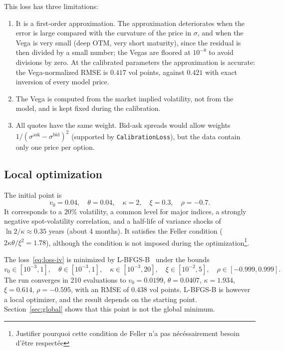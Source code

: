 \documentclass[11pt,a4paper]{article}
\theoremstyle{plain}
\theoremstyle{definition}
\begin{document}
This loss has three limitations:
\begin{enumerate}
    \item It is a first-order approximation. The approximation deteriorates when the error is large compared with the curvature of the price in $\sigma$, and when the Vega is very small (deep OTM, very short maturity), since the residual is then divided by a small number; the Vegas are floored at $10^{-8}$ to avoid divisions by zero. At the calibrated parameters the approximation is accurate: the Vega-normalized RMSE is $0.417$ vol points, against $0.421$ with exact inversion of every model price.
    \item The Vega is computed from the market implied volatility, not from the model, and is kept fixed during the calibration.
    \item All quotes have the same weight. Bid-ask spreads would allow weights $1/(\sigma^{\mathrm{ask}}-\sigma^{\mathrm{bid}})^2$ (supported by \texttt{CalibrationLoss}), but the data contain only one price per option.
\end{enumerate}

\subsection{Local optimization}
The initial point is
\begin{equation*}
    v_0 = 0.04,\quad \theta = 0.04,\quad \kappa = 2,\quad \xi = 0.3,\quad \rho = -0.7 .
\end{equation*}
It corresponds to a $20\%$ volatility, a common level for major indices, a strongly negative spot-volatility correlation, and a half-life of variance shocks of $\ln 2/\kappa\approx0.35$ years (about 4 months). It satisfies the Feller condition ($2\kappa\theta/\xi^2=1.78$), although the condition is not imposed during the optimization\footnote{Justifier pourquoi cette condition de Feller n'a pas nécéssairement besoin d'être respectée}.

The loss~\eqref{eq:loss-iv} is minimized by L-BFGS-B~\cite{byrd} under the bounds
\begin{equation}
    v_0\in[10^{-3},1],\quad
    \theta\in[10^{-3},1],\quad
    \kappa\in[10^{-3},20],\quad
    \xi\in[10^{-2},5],\quad
    \rho\in[-0.999,0.999].
    \label{eq:bounds}
\end{equation}
The run converges in 210 evaluations to $v_0=0.0199$, $\theta=0.0407$, $\kappa=1.934$, $\xi=0.614$, $\rho=-0.595$, with an RMSE of $0.438$ vol points. L-BFGS-B is however a local optimizer, and the result depends on the starting point. Section~\ref{sec:global} shows that this point is not the global minimum.
\end{document}
